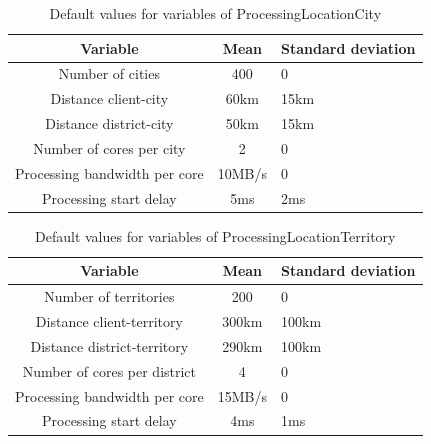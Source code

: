 \begin{table}[H]
\centering
\begin{tabular}{|c|c|l|}
\rowcolor{bluepoli!40} %
\hline
\textbf{Variable}               & \textbf{Mean}   & \textbf{Standard deviation}   \\ \hline \hline
Number of cities                & 400             & 0                             \\ \hline
Distance client-city            & 60km            & 15km                          \\ \hline
Distance district-city          & 50km            & 15km                          \\ \hline
Number of cores per city        & 2               & 0                             \\ \hline
Processing bandwidth per core   & 10MB/s          & 0                             \\ \hline
Processing start delay          & 5ms             & 2ms                           \\ \hline
\end{tabular}
\caption{Default values for variables of ProcessingLocationCity}
\label{tab:default_setting_city}
\end{table}

\begin{table}[H]
\centering
\begin{tabular}{|c|c|l|}
\rowcolor{bluepoli!40} %
\hline
\textbf{Variable}               & \textbf{Mean}   & \textbf{Standard deviation}   \\ \hline \hline
Number of territories           & 200             & 0                             \\ \hline
Distance client-territory       & 300km           & 100km                         \\ \hline
Distance district-territory     & 290km           & 100km                         \\ \hline
Number of cores per district    & 4               & 0                             \\ \hline
Processing bandwidth per core   & 15MB/s          & 0                             \\ \hline
Processing start delay          & 4ms             & 1ms                           \\ \hline
\end{tabular}
\caption{Default values for variables of ProcessingLocationTerritory}
\label{tab:default_setting_territory}
\end{table}

